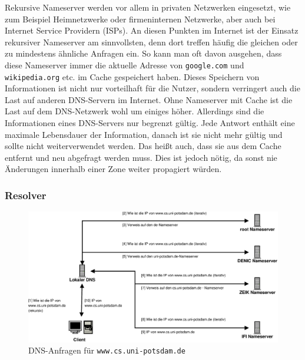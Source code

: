 \documentclass[a4paper, 12pt, BCOR10mm, DIV12, toc=bibliography, toc=listof, german]{scrbook}
\begin{document}
			Rekursive Nameserver werden vor allem in privaten Netzwerken eingesetzt, wie zum Beispiel
			Heimnetzwerke oder firmeninternen Netzwerke, aber auch bei Internet Service Providern
			(ISPs). An diesen Punkten im Internet ist der Einsatz rekursiver Nameserver am sinnvollsten,
			denn dort treffen häufig die gleichen oder zu mindestens ähnliche Anfragen ein. So kann man
			oft davon ausgehen, dass diese Nameserver immer die aktuelle Adresse von \texttt{google.com} und
			\texttt{wikipedia.org} etc. im Cache gespeichert haben. Dieses Speichern von Informationen
			ist nicht nur vorteilhaft für die Nutzer, sondern verringert auch die Last auf anderen
			DNS-Servern im Internet. Ohne Nameserver mit Cache ist die Last auf dem DNS-Netzwerk wohl um
			einiges höher. Allerdings sind die Informationen eines DNS-Servers nur begrenzt gültig.
			Jede Antwort enthält eine maximale Lebensdauer der Information, danach ist sie nicht mehr
			gültig und sollte nicht weiterverwendet werden. Das heißt auch, dass sie aus dem Cache entfernt
			und neu abgefragt werden muss. Dies ist jedoch nötig, da sonst nie Änderungen innerhalb einer Zone
			weiter propagiert würden.


			\subsubsection*{Resolver} %

				\begin{figure}
					\centering
					\includegraphics[width=\textwidth]{images/request}
					\caption{DNS-Anfragen für \texttt{www.cs.uni-potsdam.de}} %
					\label{fig:bsp-request}
				\end{figure}
\end{document}
